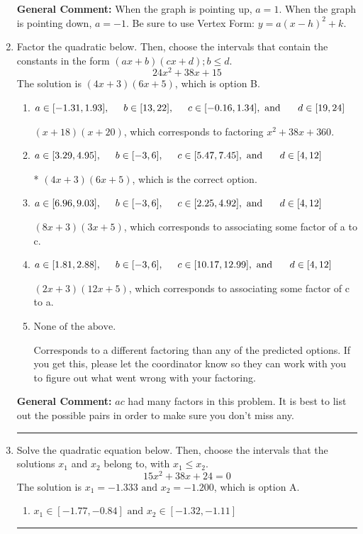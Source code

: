 \documentclass{extbook}[14pt]
\newcommand{\litem}[1]{\item #1

\rule{\textwidth}{0.4pt}}
\begin{document}
\begin{enumerate}
{\textbf{General Comment:} When the graph is pointing up, $a=1$. When the graph is pointing down, $a=-1$. Be sure to use Vertex Form: $y = a(x-h)^2+k$.
}
\litem{
Factor the quadratic below. Then, choose the intervals that contain the constants in the form $(ax+b)(cx+d); b \leq d.$
\[ 24x^{2} +38 x + 15 \]The solution is \( (4x + 3)(6x + 5) \), which is option B.\begin{enumerate}[label=\Alph*.]
\item \( a \in [-1.31, 1.93], \hspace*{5mm} b \in [13, 22], \hspace*{5mm} c \in [-0.16, 1.34], \text{ and } \hspace*{5mm} d \in [19, 24] \)

 $(x + 18)(x + 20)$, which corresponds to factoring $x^{2} +38 x + 360$.
\item \( a \in [3.29, 4.95], \hspace*{5mm} b \in [-3, 6], \hspace*{5mm} c \in [5.47, 7.45], \text{ and } \hspace*{5mm} d \in [4, 12] \)

* $(4x + 3)(6x + 5)$, which is the correct option.
\item \( a \in [6.96, 9.03], \hspace*{5mm} b \in [-3, 6], \hspace*{5mm} c \in [2.25, 4.92], \text{ and } \hspace*{5mm} d \in [4, 12] \)

 $(8x + 3)(3x + 5)$, which corresponds to associating some factor of a to c.
\item \( a \in [1.81, 2.88], \hspace*{5mm} b \in [-3, 6], \hspace*{5mm} c \in [10.17, 12.99], \text{ and } \hspace*{5mm} d \in [4, 12] \)

 $(2x + 3)(12x + 5)$, which corresponds to associating some factor of c to a.
\item \( \text{None of the above.} \)

 Corresponds to a different factoring than any of the predicted options. If you get this, please let the coordinator know so they can work with you to figure out what went wrong with your factoring.
\end{enumerate}

\textbf{General Comment:} $ac$ had many factors in this problem. It is best to list out the possible pairs in order to make sure you don't miss any.
}
\litem{
Solve the quadratic equation below. Then, choose the intervals that the solutions $x_1$ and $x_2$ belong to, with $x_1 \leq x_2$.
\[ 15x^{2} +38 x + 24 = 0 \]The solution is \( x_1 = -1.333 \text{ and } x_2 = -1.200 \), which is option A.\begin{enumerate}[label=\Alph*.]
\item \( x_1 \in [-1.77, -0.84] \text{ and } x_2 \in [-1.32, -1.11] \)


\end{enumerate}}
\end{enumerate}
\end{document}
